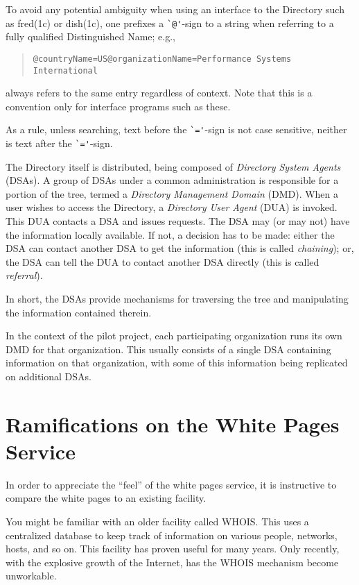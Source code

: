 To avoid any potential ambiguity when using an interface to the Directory
such as \man fred(1c) or \man dish(1c),
one prefixes a \verb"`@'"-sign to a string when referring to a fully
qualified Distinguished Name;
e.g.,
\begin{quote}\small\begin{verbatim}
@countryName=US@organizationName=Performance Systems International
\end{verbatim}\end{quote}
always refers to the same entry regardless of context.
Note that this is a convention only for interface programs such as these.

As a rule,
unless searching,
text before the \verb"`='"-sign is not case sensitive,
neither is text after the \verb"`='"-sign.

The Directory itself is distributed,
being composed of {\em Directory System Agents\/} (DSAs).
A group of DSAs under a common administration is responsible for a portion of
the tree,
termed a {\em Directory Management Domain\/} (DMD).
When a user wishes to access the Directory,
a {\em Directory User Agent\/} (DUA) is invoked.
This DUA contacts a DSA and issues requests.
The DSA may (or may not) have the information locally available.
If not,
a decision has to be made:
either the DSA can contact another DSA to get the information
(this is called {\em chaining\/}); or,
the DSA can tell the DUA to contact another DSA directly
(this is called {\em referral\/}).

In short,
the DSAs provide mechanisms for traversing the tree and manipulating the
information contained therein.

In the context of the pilot project,
each participating organization runs its own DMD for that organization.
This usually consists of a single DSA containing information on that
organization,
with some of this information being replicated on additional DSAs.

\section	{Ramifications on the White Pages Service}
In order to appreciate the ``feel'' of the white pages service,
it is instructive to compare the white pages to an existing facility.

You might be familiar with an older facility called WHOIS.
This uses a centralized database to keep track of information on various
people, networks, hosts, and so on.
This facility has proven useful for many years.
Only recently,
with the explosive growth of the Internet,
has the WHOIS mechanism become unworkable.

